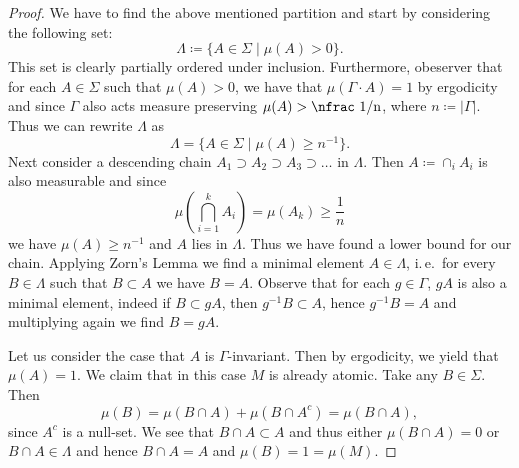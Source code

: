 \begin{proof}
  We have to find the above mentioned partition and start by considering the following set:
  \[
    \Lambda \coloneqq \{A \in \Sigma \mid \mu(A) > 0\}.
  \]
  This set is clearly partially ordered under inclusion. Furthermore, obeserver that for each \(A \in \Sigma\) such that \(\mu(A) > 0\), we have that \(\mu(\Gamma \cdot A) = 1\) by ergodicity and since \(\Gamma\) also acts measure preserving \(\mu(A) > \text{\nfrac 1/n}\), where \(n \coloneqq |\Gamma|\). Thus we can rewrite \(\Lambda\) as
  \[
    \Lambda = \{A \in \Sigma \mid \mu(A) \geq n^{-1}\}.
  \]
  Next consider a descending chain \(A_1 \supset A_2 \supset A_3 \supset \dots\) in \(\Lambda\). Then \(A \coloneqq \cap_i A_i\) is also measurable and since
  \[
    \mu\left(\bigcap_{i=1}^k A_i \right) = \mu(A_k) \geq \frac1n
  \]
  we have \(\mu(A) \geq n^{-1}\) and \(A\) lies in \(\Lambda\). Thus we have found a lower bound for our chain. Applying Zorn's Lemma we find a minimal element \(A \in \Lambda\), i.\,e.\ for every \(B \in \Lambda\) such that \(B \subset A\) we have \(B = A\). Observe that for each \(g \in \Gamma\), \(gA\) is also a minimal element, indeed if \(B \subset gA\), then \(g^{-1} B \subset A\), hence \(g^{-1}B = A\) and multiplying again we find \(B = gA\).

  Let us consider the case that \(A\) is \(\Gamma\)-invariant. Then by ergodicity, we yield that \(\mu(A) = 1\). We claim that in this case \(M\) is already atomic. Take any \(B \in \Sigma\).
  Then
  \[
    \mu(B) = \mu(B \cap A) + \mu(B \cap A^c) = \mu(B \cap A),
  \]
  since \(A^c\) is a null-set. We see that \(B \cap A \subset A\) and thus either \(\mu(B \cap A) = 0\) or \(B  \cap A \in \Lambda\) and hence \(B \cap A = A\) and \(\mu(B) = 1 = \mu(M)\).


\end{proof}
